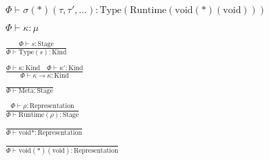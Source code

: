 \documentclass {article}
\begin{document}
\begin{gather*}
{\Phi \vdash \sigma (*) (\tau, \tau', \dots) : \text{Type} (\text{Runtime} (\text{void}(*)(\text{void})))} \\
\\
\Phi \vdash \kappa : \mu \tag*{[Kind Validation]} \\
\\
\frac
{\Phi \vdash s : \text{Stage}}
{\Phi \vdash \text {Type} (s) : \text{Kind}} \\
\\
\frac
{\Phi \vdash \kappa : \text{Kind} \quad \Phi \vdash \kappa' : \text{Kind}}
{\Phi \vdash \kappa \to \kappa : \text{Kind} } \\
\\
\frac
{}
{\Phi \vdash \text{Meta} : \text{Stage}} \\
\\
\frac
{\Phi \vdash \rho : \text{Representation}}
{\Phi \vdash \text{Runtime} (\rho) : \text{Stage}} \\
\\
\frac
{}
{\Phi \vdash \text{void}* : \text{Representation}} \\
\\
\frac
{}
{\Phi \vdash \text{void}(*)(\text{void}) : \text{Representation}}
\end{gather*}
\end{document}
